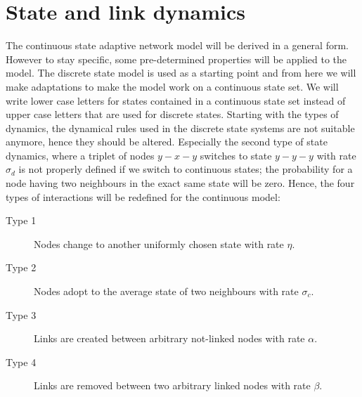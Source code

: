 \section{State and link dynamics}
The continuous state adaptive network model will be derived in a general form. However to stay specific, some pre-determined properties will be applied to the model. The discrete state model is used as a starting point and from here we will make adaptations to make the model work on a continuous state set. We will write lower case letters for states contained in a continuous state set instead of upper case letters that are used for discrete states.  Starting with the types of dynamics, the dynamical rules used in the discrete state systems are not suitable anymore, hence they should be altered.  Especially the second type of state dynamics, where a triplet of nodes $y-x-y$ switches to state $y-y-y$ with rate $\sigma_d$ is not properly defined if we switch to continuous states; the probability for a node having two neighbours in the exact same state will be zero. Hence, the four types of interactions will be redefined for the continuous model:

\begin{description}
    \item [Type 1] Nodes change to another uniformly chosen state with rate $\eta$.
    \item [Type 2] Nodes adopt to the average state of two neighbours with rate $\sigma_c$. 
    \item [Type 3] Links are created between arbitrary not-linked nodes with rate $\alpha$.
    \item [Type 4] Links are removed between two arbitrary linked nodes with rate $\beta$.
\end{description}


